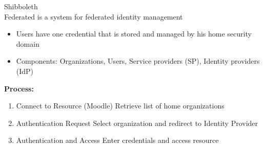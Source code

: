 \begin{definition}{Shibboleth}\\
    Federated is a system for federated identity management
    \begin{itemize}
        \item Users have one credential that is stored and managed by his home security domain
        \item Components: Organizations, Users, Service providers (SP), Identity providers (IdP)
    \end{itemize}
    
    \textbf{Process:}
    \begin{enumerate}
        \item Connect to Resource (Moodle) Retrieve list of home organizations
        \item Authentication Request Select organization and redirect to Identity Provider
        \item Authentication and Access Enter credentials and access resource
    \end{enumerate}
\end{definition}


